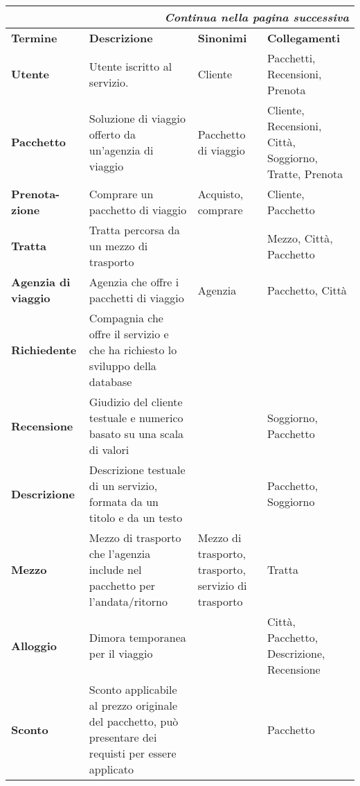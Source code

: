 \begin{center}
    \begin{tabularx}{\textwidth}{p{} X p{} p{}}
        \caption{Dizionario termini}\\\toprule\endfirsthead
        \toprule\endhead
        \midrule\multicolumn{4}{r}{\itshape Continua nella pagina successiva}\\\midrule\endfoot
        \bottomrule\endlastfoot
        \textbf{Termine} & \textbf{Descrizione} & \textbf{Sinonimi} & \textbf{Collegamenti} \\
        \midrule
        \textbf{Utente} & Utente iscritto al servizio. & Cliente & Pacchetti, Recensioni, Prenota
        \\\midrule
        \textbf{Pacchetto} & Soluzione di viaggio offerto da un'agenzia di viaggio & Pacchetto di viaggio & Cliente, Recensioni, Città, Soggiorno, Tratte, Prenota
        \\\midrule
        \textbf{Prenota-zione} & Comprare un pacchetto di viaggio & Acquisto, comprare & Cliente, Pacchetto
        \\\midrule
        \textbf{Tratta} & Tratta percorsa da un mezzo di trasporto & & Mezzo, Città, Pacchetto
        \\\midrule
        \textbf{Agenzia di viaggio} & Agenzia che offre i pacchetti di viaggio & Agenzia & Pacchetto, Città
        \\\midrule
        \textbf{Richiedente} & Compagnia che offre il servizio e che ha richiesto lo sviluppo della database & &
        \\\midrule
        \textbf{Recensione} & Giudizio del cliente testuale e numerico basato su una scala di valori & & Soggiorno, Pacchetto %
        \\\midrule
        \textbf{Descrizione} & Descrizione testuale di un servizio, formata da un titolo e da un testo & & Pacchetto, Soggiorno
        \\\midrule
        \textbf{Mezzo} & Mezzo di trasporto che l'agenzia include nel pacchetto per l'andata/ritorno & Mezzo di trasporto, trasporto, servizio di trasporto & Tratta
        \\\midrule
        \textbf{Alloggio} & Dimora temporanea per il viaggio & & Città, Pacchetto, Descrizione, Recensione
        \\\midrule
        \textbf{Sconto} & Sconto applicabile al prezzo originale del pacchetto, può presentare dei requisti per essere applicato & & Pacchetto
        \\
    \end{tabularx}
\end{center}

